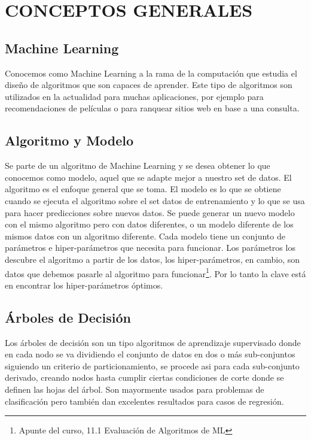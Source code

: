 \section{CONCEPTOS GENERALES}

\subsection{Machine Learning}
Conocemos como Machine Learning a la rama de la computación que estudia el diseño de algoritmos que son capaces de aprender. Este tipo de algoritmos son utilizados en la actualidad para muchas aplicaciones, por ejemplo para recomendaciones de películas o para ranquear sitios web en base a una consulta.


\subsection{Algoritmo y Modelo}

Se parte de un algoritmo de Machine Learning y se desea obtener lo que conocemos como modelo, aquel que se adapte mejor a nuestro set de datos. El algoritmo es el enfoque general que se toma. El modelo es lo que se obtiene cuando se ejecuta el algoritmo sobre el set datos de entrenamiento y lo que se usa para hacer predicciones sobre nuevos datos. Se puede generar un nuevo modelo con el mismo algoritmo pero con datos diferentes, o un modelo diferente de los mismos datos con un algoritmo diferente. 
Cada modelo tiene un conjunto de parámetros e hiper-parámetros que necesita para funcionar. Los parámetros los descubre el algoritmo a partir de los datos, los hiper-parámetros, en cambio, son datos que debemos pasarle al algoritmo para funcionar\footnote{Apunte del curso, 11.1
Evaluación de Algoritmos de ML}. Por lo tanto la clave está en encontrar los hiper-parámetros óptimos.


\subsection{Árboles de Decisión}

Los árboles de decisión son un tipo algoritmos de aprendizaje supervisado donde en cada nodo se va dividiendo el conjunto de datos en dos o más sub-conjuntos siguiendo un criterio de particionamiento, se procede asi para cada sub-conjunto derivado, creando nodos hasta cumplir ciertas condiciones de corte donde se definen las hojas del árbol. Son mayormente usados para problemas de clasificación pero también dan excelentes resultados para casos de regresión.


